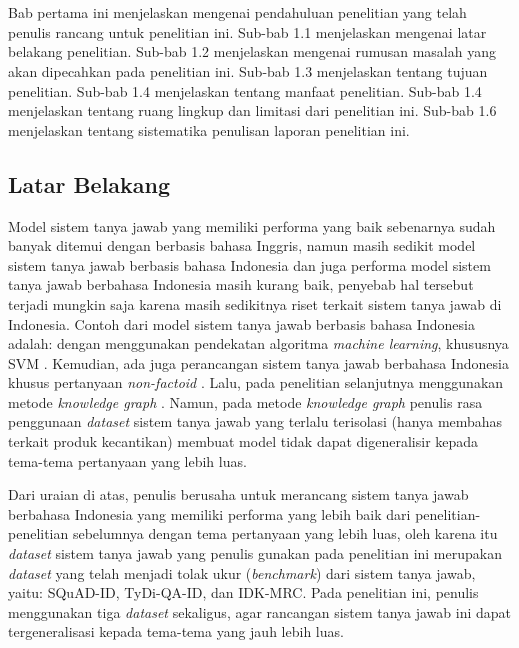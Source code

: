 \chapter{\babSatu}
\label{bab:1}
Bab pertama ini menjelaskan mengenai pendahuluan penelitian yang telah penulis rancang untuk penelitian ini. Sub-bab 1.1 menjelaskan mengenai latar belakang penelitian. Sub-bab 1.2 menjelaskan mengenai rumusan masalah yang akan dipecahkan pada penelitian ini. Sub-bab 1.3 menjelaskan tentang tujuan penelitian. Sub-bab 1.4 menjelaskan tentang manfaat penelitian. Sub-bab 1.4 menjelaskan tentang ruang lingkup dan limitasi dari penelitian ini. Sub-bab 1.6 menjelaskan tentang sistematika penulisan laporan penelitian ini.

\section{Latar Belakang}
Model sistem tanya jawab yang memiliki performa yang baik sebenarnya sudah banyak ditemui dengan berbasis bahasa Inggris, namun masih sedikit model sistem tanya jawab berbasis bahasa Indonesia dan juga performa model sistem tanya jawab berbahasa Indonesia masih kurang baik, penyebab hal tersebut terjadi mungkin saja karena masih sedikitnya riset terkait sistem tanya jawab di Indonesia. Contoh dari model sistem tanya jawab berbasis bahasa Indonesia adalah: dengan menggunakan pendekatan algoritma \emph{machine learning}, khususnya SVM \citep{machine-learning-approach}. Kemudian, ada juga perancangan sistem tanya jawab berbahasa Indonesia khusus pertanyaan \emph{non-factoid} \citep{Purwarianti_Yusliani_2012}. Lalu, pada penelitian selanjutnya menggunakan metode \emph{knowledge graph} \citep{JLK}. Namun, pada metode \emph{knowledge graph} penulis rasa penggunaan \emph{dataset} sistem tanya jawab yang terlalu terisolasi (hanya membahas terkait produk kecantikan) membuat model tidak dapat digeneralisir kepada tema-tema pertanyaan yang lebih luas.

Dari uraian di atas, penulis berusaha untuk merancang sistem tanya jawab berbahasa Indonesia yang memiliki performa yang lebih baik dari penelitian-penelitian sebelumnya dengan tema pertanyaan yang lebih luas, oleh karena itu \emph{dataset} sistem tanya jawab yang penulis gunakan pada penelitian ini merupakan \emph{dataset} yang telah menjadi tolak ukur (\emph{benchmark}) dari sistem tanya jawab, yaitu: SQuAD-ID, TyDi-QA-ID, dan IDK-MRC. Pada penelitian ini, penulis menggunakan tiga \emph{dataset} sekaligus, agar rancangan sistem tanya jawab ini dapat tergeneralisasi kepada tema-tema yang jauh lebih luas.

